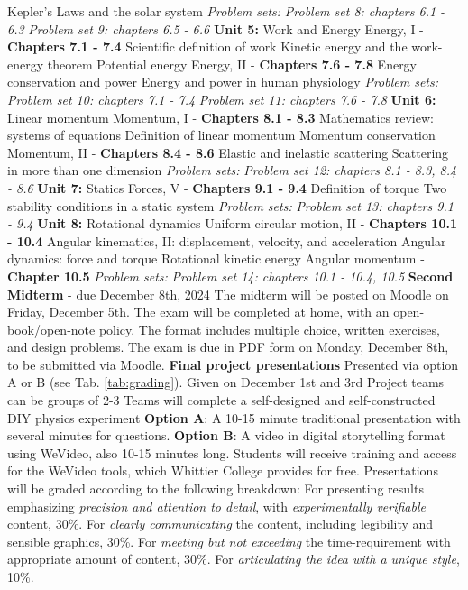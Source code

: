 \documentclass[10pt]{article}
\begin{document}
\begin{outline}[enumerate]
\3 Kepler's Laws and the solar system
\2 \textit{Problem sets:}
\3 \textit{Problem set 8: chapters 6.1 - 6.3}
\3 \textit{Problem set 9: chapters 6.5 - 6.6}
\1 \textbf{Unit 5:} Work and Energy
\2 Energy, I - \textbf{Chapters 7.1 - 7.4}
\3 Scientific definition of work
\3 Kinetic energy and the work-energy theorem
\3 Potential energy
\2 Energy, II - \textbf{Chapters 7.6 - 7.8}
\3 Energy conservation and power
\3 Energy and power in human physiology
\2 \textit{Problem sets:}
\3 \textit{Problem set 10: chapters 7.1 - 7.4}
\3 \textit{Problem set 11: chapters 7.6 - 7.8}
\1 \textbf{Unit 6:} Linear momentum
\2 Momentum, I - \textbf{Chapters 8.1 - 8.3}
\3 Mathematics review: systems of equations
\3 Definition of linear momentum
\3 Momentum conservation
\2 Momentum, II - \textbf{Chapters 8.4 - 8.6}
\3 Elastic and inelastic scattering
\3 Scattering in more than one dimension
\2 \textit{Problem sets:}
\3 \textit{Problem set 12: chapters 8.1 - 8.3, 8.4 - 8.6}
\1 \textbf{Unit 7:} Statics
\2 Forces, V - \textbf{Chapters 9.1 - 9.4}
\3 Definition of torque
\3 Two stability conditions in a static system
\2 \textit{Problem sets:}
\3 \textit{Problem set 13: chapters 9.1 - 9.4}
\1 \textbf{Unit 8:} Rotational dynamics
\2 Uniform circular motion, II - \textbf{Chapters 10.1 - 10.4}
\3 Angular kinematics, II: displacement, velocity, and acceleration 
\3 Angular dynamics: force and torque
\3 Rotational kinetic energy
\2 Angular momentum - \textbf{Chapter 10.5}
\2 \textit{Problem sets:}
\3 \textit{Problem set 14: chapters 10.1 - 10.4, 10.5}
\1 \textbf{Second Midterm} - due December 8th, 2024
\2 The midterm will be posted on Moodle on Friday, December 5th.
\2 The exam will be completed at home, with an open-book/open-note policy.  The format includes multiple choice, written exercises, and design problems.
\2 The exam is due in PDF form on Monday, December 8th, to be submitted via Moodle.
\1 \textbf{Final project presentations}
\2 Presented via option A or B (see Tab. \ref{tab:grading}).
\2 Given on December 1st and 3rd
\2 Project teams can be groups of 2-3
\2 Teams will complete a self-designed and self-constructed DIY physics experiment
\2 \textbf{Option A}: A 10-15 minute traditional presentation with several minutes for questions.
\2 \textbf{Option B}: A video in digital storytelling format using WeVideo, also 10-15 minutes long.
\2 Students will receive training and access for the WeVideo tools, which Whittier College provides for free.
\2 Presentations will be graded according to the following breakdown:
\3 For presenting results emphasizing \textit{precision and attention to detail}, with \textit{experimentally verifiable} content, 30\%.
\3 For \textit{clearly communicating} the content, including legibility and sensible graphics, 30\%.
\3 For \textit{meeting but not exceeding} the time-requirement with appropriate amount of content, 30\%.
\3 For \textit{articulating the idea with a unique style}, 10\%.
\end{outline}
\end{document}
